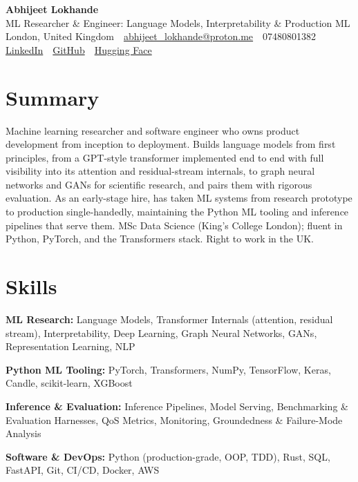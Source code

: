 \documentclass[10pt,a4paper]{article}
\newcommand{\sep}{\,\textcolor{accent!60}{\textbar}\,}
\begin{document}
\begin{center}
  {\fontsize{24}{26}\selectfont\bfseries Abhijeet Lokhande}\\[3pt]
  {\color{accent}\large ML Researcher \& Engineer: Language Models, Interpretability \& Production ML}\\[5pt]
  {\small
    London, United Kingdom \sep
    \href{mailto:abhijeet_lokhande@proton.me}{abhijeet\_lokhande@proton.me} \sep
    07480801382 \\[2pt]
    \href{https://www.linkedin.com/in/ablds/}{LinkedIn} \sep
    \href{https://github.com/abhijeetscode}{GitHub} \sep
    \href{https://huggingface.co/ab-ai}{Hugging Face}
  }
\end{center}
\vspace{2pt}

\section{Summary}
Machine learning researcher and software engineer who owns product development from inception to deployment. Builds language models from first principles, from a GPT-style transformer implemented end to end with full visibility into its attention and residual-stream internals, to graph neural networks and GANs for scientific research, and pairs them with rigorous evaluation. As an early-stage hire, has taken ML systems from research prototype to production single-handedly, maintaining the Python ML tooling and inference pipelines that serve them. MSc Data Science (King's College London); fluent in Python, PyTorch, and the Transformers stack. Right to work in the UK.

\section{Skills}
\begin{tight}
  \item[\textcolor{accent}{\small$\bullet$}] \textbf{ML Research:} Language Models, Transformer Internals (attention, residual stream), Interpretability, Deep Learning, Graph Neural Networks, GANs, Representation Learning, NLP
  \item[\textcolor{accent}{\small$\bullet$}] \textbf{Python ML Tooling:} PyTorch, Transformers, NumPy, TensorFlow, Keras, Candle, scikit-learn, XGBoost
  \item[\textcolor{accent}{\small$\bullet$}] \textbf{Inference \& Evaluation:} Inference Pipelines, Model Serving, Benchmarking \& Evaluation Harnesses, QoS Metrics, Monitoring, Groundedness \& Failure-Mode Analysis
  \item[\textcolor{accent}{\small$\bullet$}] \textbf{Software \& DevOps:} Python (production-grade, OOP, TDD), Rust, SQL, FastAPI, Git, CI/CD, Docker, AWS
\end{tight}
\end{document}
